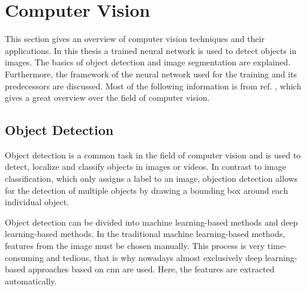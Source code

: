 \section{Computer Vision}
\label{sec:computer_vision}
This section gives an overview of computer vision techniques and their applications.
In this thesis a trained neural network is used to detect objects in images.
The basics of object detection and image segmentation are explained.
Furthermore, the framework of the neural network used for the training and its predecessors are discussed.
Most of the following information is from ref. \cite{Szeliski2022}, which gives a great overview over the field of computer vision.


\subsection{Object Detection}
Object detection is a common task in the field of computer vision and is used to detect, localize and classify objects in images or videos.
In contrast to image classification, which only assigns a label to an image, objection detection allows for the detection of multiple objects by drawing a bounding box around each individual object.\par
Object detection can be divided into machine learning-based methods and deep learning-based methods.
In the traditional machine learning-based methods, features from the image must be chosen manually.
This process is very time-consuming and tedious, that is why nowadays almost exclusively deep learning-based approaches based on \gls{cnn} are used.
Here, the features are extracted automatically.


